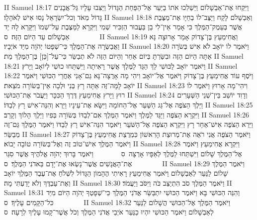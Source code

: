 II Samuel 18:17	וַיִּקְחוּ אֶת־אַבְשָׁלוֹם וַיַּשְׁלִכוּ אֹתוֹ בַיַּעַר אֶל־הַפַּחַת הַגָּדוֹל וַיַּצִּבוּ עָלָיו גַּל־אֲבָנִים גָּדוֹל מְאֹד וְכל־יִשְׂרָאֵל נָסוּ אִישׁ לְאֹהָלָו׃
II Samuel 18:18	וְאַבְשָׁלֹם לָקַח וַיַּצֶּב־לוֹ בְחַיָּו אֶת־מַצֶּבֶת אֲשֶׁר בְּעֵמֶק־הַמֶּלֶךְ כִּי אָמַר אֵין־לִי בֵן בַּעֲבוּר הַזְכִּיר שְׁמִי וַיִּקְרָא לַמַּצֶּבֶת עַל־שְׁמוֹ וַיִּקָּרֵא לָהּ יַד אַבְשָׁלוֹם עַד הַיּוֹם הַזֶּה׃ {ס}        
II Samuel 18:19	וַאֲחִימַעַץ בֶּן־צָדוֹק אָמַר אָרוּצָה נָּא וַאֲבַשְּׂרָה אֶת־הַמֶּלֶךְ כִּי־שְׁפָטוֹ יְהֹוָה מִיַּד אֹיְבָיו׃
II Samuel 18:20	וַיֹּאמֶר לוֹ יוֹאָב לֹא אִישׁ בְּשֹׂרָה אַתָּה הַיּוֹם הַזֶּה וּבִשַּׂרְתָּ בְּיוֹם אַחֵר וְהַיּוֹם הַזֶּה לֹא תְבַשֵּׂר כִּי־עַל־[כֵּן] בֶּן־הַמֶּלֶךְ מֵת׃
II Samuel 18:21	וַיֹּאמֶר יוֹאָב לַכּוּשִׁי לֵךְ הַגֵּד לַמֶּלֶךְ אֲשֶׁר רָאִיתָה וַיִּשְׁתַּחוּ כוּשִׁי לְיוֹאָב וַיָּרֹץ׃
II Samuel 18:22	וַיֹּסֶף עוֹד אֲחִימַעַץ בֶּן־צָדוֹק וַיֹּאמֶר אֶל־יוֹאָב וִיהִי מָה אָרֻצָה־נָּא גַם־אָנִי אַחֲרֵי הַכּוּשִׁי וַיֹּאמֶר יוֹאָב לָמָּה־זֶּה אַתָּה רָץ בְּנִי וּלְכָה אֵין־בְּשׂוֹרָה מֹצֵאת׃
II Samuel 18:23	וִיהִי־מָה אָרוּץ וַיֹּאמֶר לוֹ רוּץ וַיָּרץ אֲחִימַעַץ דֶּרֶךְ הַכִּכָּר וַיַּעֲבֹר אֶת־הַכּוּשִׁי׃
II Samuel 18:24	וְדָוִד יוֹשֵׁב בֵּין־שְׁנֵי הַשְּׁעָרִים וַיֵּלֶךְ הַצֹּפֶה אֶל־גַּג הַשַּׁעַר אֶל־הַחוֹמָה וַיִּשָּׂא אֶת־עֵינָיו וַיַּרְא וְהִנֵּה־אִישׁ רָץ לְבַדּוֹ׃
II Samuel 18:25	וַיִּקְרָא הַצֹּפֶה וַיַּגֵּד לַמֶּלֶךְ וַיֹּאמֶר הַמֶּלֶךְ אִם־לְבַדּוֹ בְּשׂוֹרָה בְּפִיו וַיֵּלֶךְ הָלוֹךְ וְקָרֵב׃
II Samuel 18:26	וַיַּרְא הַצֹּפֶה אִישׁ־אַחֵר רָץ וַיִּקְרָא הַצֹּפֶה אֶל־הַשֹּׁעֵר וַיֹּאמֶר הִנֵּה־אִישׁ רָץ לְבַדּוֹ וַיֹּאמֶר הַמֶּלֶךְ גַּם־זֶה מְבַשֵּׂר׃
II Samuel 18:27	וַיֹּאמֶר הַצֹּפֶה אֲנִי רֹאֶה אֶת־מְרוּצַת הָרִאשׁוֹן כִּמְרֻצַת אֲחִימַעַץ בֶּן־צָדוֹק וַיֹּאמֶר הַמֶּלֶךְ אִישׁ־טוֹב זֶה וְאֶל־בְּשׂוֹרָה טוֹבָה יָבוֹא׃
II Samuel 18:28	וַיִּקְרָא אֲחִימַעַץ וַיֹּאמֶר אֶל־הַמֶּלֶךְ שָׁלוֹם וַיִּשְׁתַּחוּ לַמֶּלֶךְ לְאַפָּיו אָרְצָה {ס}        וַיֹּאמֶר בָּרוּךְ יְהֹוָה אֱלֹהֶיךָ אֲשֶׁר סִגַּר אֶת־הָאֲנָשִׁים אֲשֶׁר־נָשְׂאוּ אֶת־יָדָם בַּאדֹנִי הַמֶּלֶךְ׃ {ס}        
II Samuel 18:29	וַיֹּאמֶר הַמֶּלֶךְ שָׁלוֹם לַנַּעַר לְאַבְשָׁלוֹם וַיֹּאמֶר אֲחִימַעַץ רָאִיתִי הֶהָמוֹן הַגָּדוֹל לִשְׁלֹחַ אֶת־עֶבֶד הַמֶּלֶךְ יוֹאָב וְאֶת־עַבְדֶּךָ וְלֹא יָדַעְתִּי מָה׃
II Samuel 18:30	וַיֹּאמֶר הַמֶּלֶךְ סֹב הִתְיַצֵּב כֹּה וַיִּסֹּב וַיַּעֲמֹד׃
II Samuel 18:31	וְהִנֵּה הַכּוּשִׁי בָּא וַיֹּאמֶר הַכּוּשִׁי יִתְבַּשֵּׂר אֲדֹנִי הַמֶּלֶךְ כִּי־שְׁפָטְךָ יְהֹוָה הַיּוֹם מִיַּד כּל־הַקָּמִים עָלֶיךָ׃ {ס}        
II Samuel 18:32	וַיֹּאמֶר הַמֶּלֶךְ אֶל־הַכּוּשִׁי הֲשָׁלוֹם לַנַּעַר לְאַבְשָׁלוֹם וַיֹּאמֶר הַכּוּשִׁי יִהְיוּ כַנַּעַר אֹיְבֵי אֲדֹנִי הַמֶּלֶךְ וְכֹל אֲשֶׁר־קָמוּ עָלֶיךָ לְרָעָה׃ {ס}        
